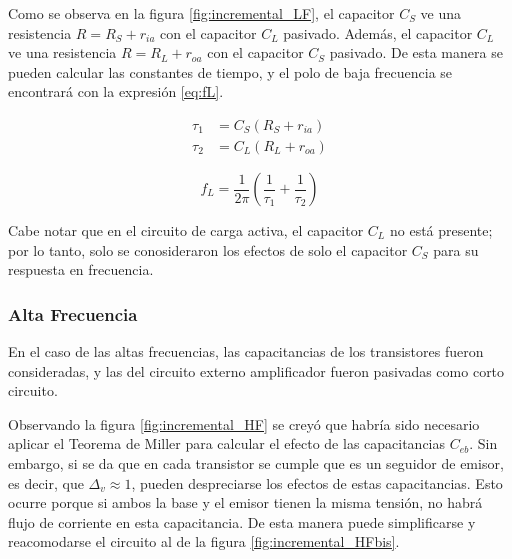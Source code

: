 Como se observa en la figura \ref{fig:incremental_LF}, el capacitor $C_S$ ve una resistencia $R = R_S + r_{ia}$ con el capacitor $C_L$ pasivado. Además, el capacitor $C_L$ ve una resistencia $R = R_L + r_{oa}$ con el capacitor $C_S$ pasivado. De esta manera se pueden calcular las constantes de tiempo, y el polo de baja frecuencia se encontrará con la expresión \eqref{eq:fL}.

\begin{align*}
    \tau_1 &= C_S (R_S + r_{ia}) \\
    \tau_2 &= C_L (R_L + r_{oa})
\end{align*}

\begin{equation}
    f_L = \frac{1}{2\pi}\left(\frac{1}{\tau_1}+\frac{1}{\tau_2}\right)
    \label{eq:fL}
\end{equation}


Cabe notar que en el circuito de carga activa, el capacitor $C_L$ no está presente; por lo tanto, solo se conosideraron los efectos de solo el capacitor $C_S$ para su respuesta en frecuencia.

\subsubsection{Alta Frecuencia}
En el caso de las altas frecuencias, las capacitancias de los transistores fueron consideradas, y las del circuito externo amplificador fueron pasivadas como corto circuito.

Observando la figura \ref{fig:incremental_HF} se creyó que habría sido necesario aplicar el Teorema de Miller para calcular el efecto de las capacitancias $C_{eb}$. Sin embargo, si se da que en cada transistor se cumple que es un seguidor de emisor, es decir, que $\Delta_v \approx 1$, pueden despreciarse los efectos de estas capacitancias. Esto ocurre porque si ambos la base y el emisor tienen la misma tensión, no habrá flujo de corriente en esta capacitancia. De esta manera puede simplificarse y reacomodarse el circuito al de la figura \ref{fig:incremental_HFbis}.

